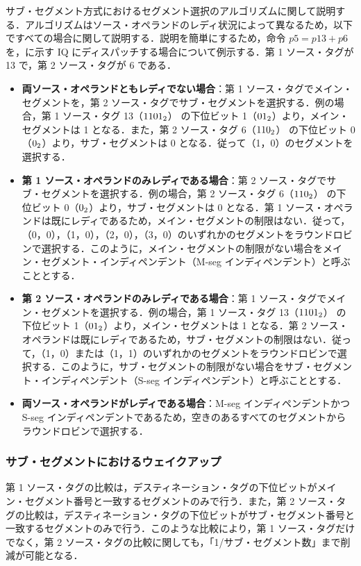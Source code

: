 サブ・セグメント方式におけるセグメント選択のアルゴリズムに関して説明する．アルゴリズムはソース・オペランドのレディ状況によって異なるため，以下ですべての場合に関して説明する．説明を簡単にするため，命令 $p5 = p13 + p6$ を，に示す IQ にディスパッチする場合について例示する．第 1 ソース・タグが 13 で，第 2 ソース・タグが 6 である．
\begin{itemize}
  \item \textbf{両ソース・オペランドともレディでない場合}：第 1 ソース・タグでメイン・セグメントを，第 2 ソース・タグでサブ・セグメントを選択する．例の場合，第 1 ソース・タグ 13（${\rm 1101_2}$） の下位ビット 1（${\rm 01_2}$）より，メイン・セグメントは 1 となる．また，第 2 ソース・タグ 6（${\rm 110_2}$） の下位ビット 0（${\rm 0_2}$）より，サブ・セグメントは 0 となる．従って（1，0）のセグメントを選択する． 
  \item \textbf{第 1 ソース・オペランドのみレディである場合}：第 2 ソース・タグでサブ・セグメントを選択する．例の場合，第 2 ソース・タグ 6（${\rm 110_2}$） の下位ビット 0（${\rm 0_2}$）より，サブ・セグメントは 0 となる．第 1 ソース・オペランドは既にレディであるため，メイン・セグメントの制限はない．従って，（0，0），（1，0），（2，0），（3，0）のいずれかのセグメントをラウンドロビンで選択する．このように，メイン・セグメントの制限がない場合をメイン・セグメント・インディペンデント（M-seg インディペンデント）と呼ぶこととする．
  \item \textbf{第 2 ソース・オペランドのみレディである場合}：第 1 ソース・タグでメイン・セグメントを選択する．例の場合，第 1 ソース・タグ 13（${\rm 1101_2}$） の下位ビット 1（${\rm 01_2}$）より，メイン・セグメントは 1 となる．第 2 ソース・オペランドは既にレディであるため，サブ・セグメントの制限はない．従って，（1，0）または（1，1）のいずれかのセグメントをラウンドロビンで選択する．このように，サブ・セグメントの制限がない場合をサブ・セグメント・インディペンデント（S-seg インディペンデント）と呼ぶこととする．
  \item \textbf{両ソース・オペランドがレディである場合}：M-seg インディペンデントかつ S-seg インディペンデントであるため，空きのあるすべてのセグメントからラウンドロビンで選択する．
\end{itemize}

\subsubsection{サブ・セグメントにおけるウェイクアップ}
第 1 ソース・タグの比較は，デスティネーション・タグの下位ビットがメイン・セグメント番号と一致するセグメントのみで行う．また，第 2 ソース・タグの比較は，デスティネーション・タグの下位ビットがサブ・セグメント番号と一致するセグメントのみで行う．このような比較により，第 1 ソース・タグだけでなく，第 2  ソース・タグの比較に関しても，「1/サブ・セグメント数」まで削減が可能となる．

